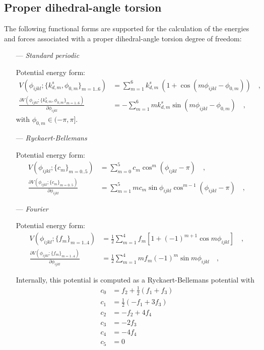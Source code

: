 \documentclass[10pt,a4paper,openany]{memoir}
\numberwithin{equation}{section}
\begin{document}
\subsection{Proper dihedral-angle torsion}
\label{sec:proper-terms}

The following functional forms are supported for the calculation of
the energies and forces associated with a proper dihedral-angle
torsion degree of freedom:\cite{GROMOS-doc,GROMACS-doc}

\begin{itemize}
\item [---] \textit{Standard periodic}
  \par
  Potential energy form:
  \begin{align}
    \label{eq:proper-standard-energy}
    V(\phi_{ijkl} ; \{k_{d,m}^s, \phi_{0,m}\}_{m=1..6}) & = \sum_{m=1}^{6} k_{d,m}^s\ (1 + \cos{( m \phi_{ijkl} - \phi_{0,m})})\quad , \\ \nonumber
    \frac{\partial V(\phi_{ijkl} ; \{k_{d,m}^s, \phi_{0,m}\}_{m=1..6})}{\partial \phi_{ijkl}} & = -\sum_{m=1}^{6} m k_{d,m}^s \sin{(m \phi_{ijkl} - \phi_{0,m})}\quad ,
  \end{align}
  with $\phi_{0,m} \in (-\pi, \pi]$.
  
\item [---]\textit{Ryckaert-Bellemans}
  \par
  Potential energy form:
  \begin{align}
    \label{eq:proper-rb-energy}
    V(\phi_{ijkl} ; \{c_m\}_{m=0..5}) & = \sum_{m=0}^{5} c_m \cos^m{(\phi_{ijkl}-\pi)} \quad , \\ \nonumber
    \frac{\partial V(\phi_{ijkl} ; \{c_m\}_{m=0..5})}{\partial \phi_{ijkl}} & = \sum_{m=1}^{5} mc_m \sin{\phi_{ijkl}} \cos^{m-1}{(\phi_{ijkl}-\pi)} \quad , 
  \end{align}

\item [---]\textit{Fourier}
  \par
  Potential energy form:
   \begin{align}
    \label{eq:proper-fourier-energy}
     V(\phi_{ijkl} ; \{f_m\}_{m=1..4}) & = \frac{1}{2} \sum_{m=1}^{4} f_m \left[1 + (-1)^{m+1}\cos m\phi_{ijkl}\right] \quad , \\ \nonumber
     \frac{\partial V(\phi_{ijkl} ; \{f_m\}_{m=1..4})}{\partial \phi_{ijkl}} & = \frac{1}{2} \sum_{m=1}^{4} m f_m (-1)^{m}\sin m\phi_{ijkl} \quad ,
   \end{align}
   
   Internally, this potential is computed as a Ryckaert-Bellemans potential with
   \begin{align*}
     c_0 & = f_2 + \frac{1}{2} (f_1 + f_3)\\
     c_1 & = \frac{1}{2} (-f_1 + 3f_3)\\
     c_2 & = -f_2 + 4f_4\\
     c_3 & = -2 f_3\\
     c_4 & = -4 f_4\\
     c_5 & = 0
   \end{align*}


\end{itemize}
\end{document}
